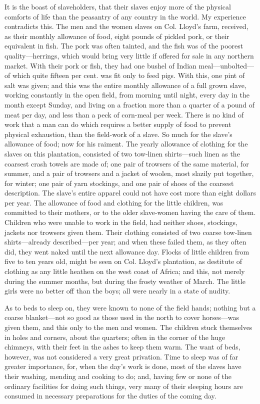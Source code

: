 It is the boast of slaveholders, that their slaves enjoy more of the
physical comforts of life than the peasantry of any country in the
world. My experience contradicts this. The men and the women slaves on
Col. Lloyd's farm, received, as their monthly allowance of food, eight
pounds of pickled pork, or their equivalent in fish. The pork was often
tainted, and the fish was of the poorest quality---herrings, which would
bring very little if offered for sale in any northern market. With their
pork or fish, they had one bushel of Indian meal---unbolted---of which
quite fifteen per cent. was fit only to feed pigs. With this, one pint
of salt was given; and this was the entire monthly allowance of a full
grown slave, working constantly in the open field, from morning until
night, every day in the month except Sunday, and living on a fraction
more than a quarter of a pound of meat per day, and less than a peck of
corn-meal per week. There is no kind of work that a man can do
{\protect\hypertarget{101}{}{}}which requires a better supply of food to
prevent physical exhaustion, than the field-work of a slave. So much for
the slave's allowance of food; now for his raiment. The yearly allowance
of clothing for the slaves on this plantation, consisted of two
tow-linen shirts---such linen as the coarsest crash towels are made of;
one pair of trowsers of the same material, for summer, and a pair of
trowsers and a jacket of woolen, most slazily put together, for winter;
one pair of yarn stockings, and one pair of shoes of the coarsest
description. The slave's entire apparel could not have cost more than
eight dollars per year. The allowance of food and clothing for the
little children, was committed to their mothers, or to the older
slave-women having the care of them. Children who were unable to work in
the field, had neither shoes, stockings, jackets nor trowsers given
them. Their clothing consisted of two coarse tow-linen shirts---already
described---per year; and when these failed them, as they often did,
they went naked until the next allowance day. Flocks of little children
from five to ten years old, might be seen on Col. Lloyd's plantation, as
destitute of clothing as any little heathen on the west coast of Africa;
and this, not merely during the summer months, but during the frosty
weather of March. The little girls were no better off than the boys; all
were nearly in a state of nudity.

As to beds to sleep on, they were known to none of the field hands;
nothing but a coarse blanket---not so good as those used in the north to
cover horses---was given them, and this only to the men and women. The
children stuck themselves in holes and corners,
{\protect\hypertarget{102}{}{}}about the quarters; often in the corner
of the huge chimneys, with their feet in the ashes to keep them warm.
The want of beds, however, was not considered a very great privation.
Time to sleep was of far greater importance, for, when the day's work is
done, most of the slaves have their washing, mending and cooking to do;
and, having few or none of the ordinary facilities for doing such
things, very many of their sleeping hours are consumed in necessary
preparations for the duties of the coming day.

